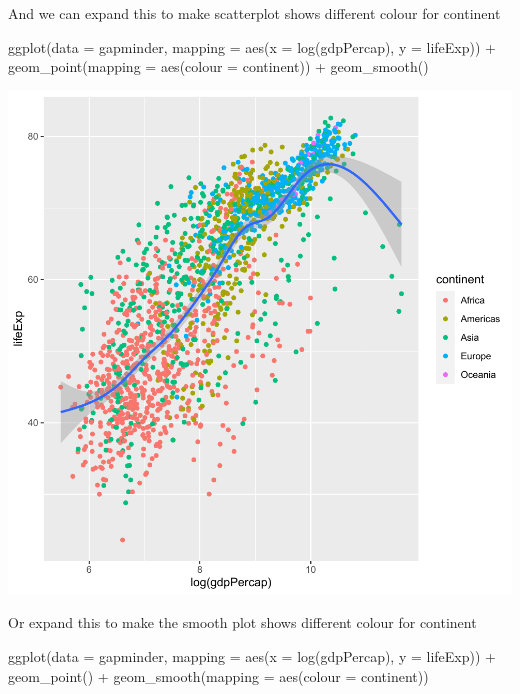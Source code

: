 \documentclass[
]{book}
\makeatletter
\newenvironment{Shaded}{\begin{snugshade}}{\end{snugshade}}
\newcommand{\AttributeTok}[1]{\textcolor[rgb]{0.61,0.61,0.61}{#1}}
\newcommand{\FunctionTok}[1]{\textcolor[rgb]{0,0,0}{#1}}
\newcommand{\NormalTok}[1]{#1}
\newcommand{\SpecialCharTok}[1]{\textcolor[rgb]{0,0,0}{#1}}
\newenvironment{kframe}{%
\medskip{}
\setlength{\fboxsep}{.8em}
 \def\at@end@of@kframe{}%
 \ifinner\ifhmode%
  \def\at@end@of@kframe{\end{minipage}}%
  \begin{minipage}{\columnwidth}%
 \fi\fi%
 \def\FrameCommand##1{\hskip\@totalleftmargin \hskip-\fboxsep
 \colorbox{shadecolor}{##1}\hskip-\fboxsep
     \hskip-\linewidth \hskip-\@totalleftmargin \hskip\columnwidth}%
 \MakeFramed {\advance\hsize-\width
   \@totalleftmargin\z@ \linewidth\hsize
   \@setminipage}}%
 {\par\unskip\endMakeFramed%
 \at@end@of@kframe}
\renewenvironment{Shaded}{\begin{kframe}}{\end{kframe}}
\makeatother
\begin{document}
And we can expand this to make scatterplot shows different colour for continent

\begin{Shaded}
\begin{Highlighting}[]
\FunctionTok{ggplot}\NormalTok{(}\AttributeTok{data =}\NormalTok{ gapminder, }\AttributeTok{mapping =} \FunctionTok{aes}\NormalTok{(}\AttributeTok{x =} \FunctionTok{log}\NormalTok{(gdpPercap), }\AttributeTok{y =}\NormalTok{ lifeExp)) }\SpecialCharTok{+}
  \FunctionTok{geom\_point}\NormalTok{(}\AttributeTok{mapping =} \FunctionTok{aes}\NormalTok{(}\AttributeTok{colour =}\NormalTok{ continent)) }\SpecialCharTok{+}
  \FunctionTok{geom\_smooth}\NormalTok{()}
\end{Highlighting}
\end{Shaded}

\begin{center}\includegraphics[width=0.7\linewidth,keepaspectratio]{Multivariable_Data_Analysis_files/figure-latex/unnamed-chunk-31-1} \end{center}

Or expand this to make the smooth plot shows different colour for continent

\begin{Shaded}
\begin{Highlighting}[]
\FunctionTok{ggplot}\NormalTok{(}\AttributeTok{data =}\NormalTok{ gapminder, }\AttributeTok{mapping =} \FunctionTok{aes}\NormalTok{(}\AttributeTok{x =} \FunctionTok{log}\NormalTok{(gdpPercap), }\AttributeTok{y =}\NormalTok{ lifeExp)) }\SpecialCharTok{+}
  \FunctionTok{geom\_point}\NormalTok{() }\SpecialCharTok{+}
  \FunctionTok{geom\_smooth}\NormalTok{(}\AttributeTok{mapping =} \FunctionTok{aes}\NormalTok{(}\AttributeTok{colour =}\NormalTok{ continent))}
\end{Highlighting}
\end{Shaded}
\end{document}
